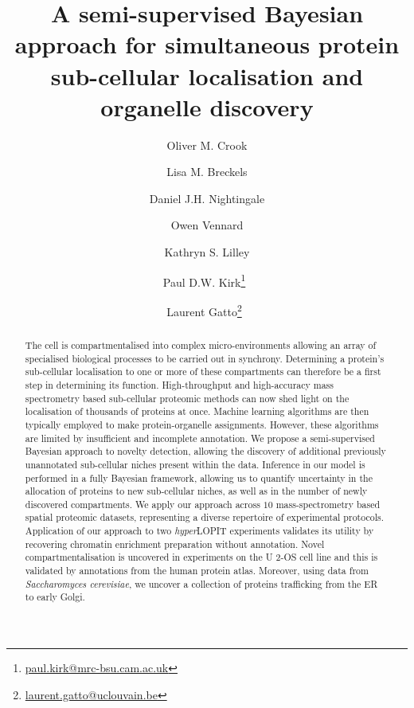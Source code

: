 \documentclass[12pt,english]{article}
\title{A semi-supervised Bayesian approach for simultaneous protein sub-cellular localisation and organelle discovery }
\author[1,2]{Oliver M. Crook}
\author[1]{Lisa M. Breckels}
\author[1]{Daniel J.H. Nightingale}
\author[1]{Owen Vennard}
\author[1]{Kathryn S. Lilley}
\author[2]{Paul D.W. Kirk\thanks{\url{paul.kirk@mrc-bsu.cam.ac.uk}}~}
\author[3]{Laurent Gatto\thanks{\url{laurent.gatto@uclouvain.be}}~}
\affil[1]{Cambridge Centre for Proteomics, Department of Biochemistry,
	University of Cambridge, Cambridge, UK}
\affil[2]{MRC Biostatistics Unit, Cambridge Institute for Public
	Health, Cambridge, UK}
\affil[3]{de Duve Institute, UCLouvain, Avenue
	Hippocrate 75, 1200 Brussels, Belgium}
\begin{document}
\maketitle

\begin{abstract}
The cell is compartmentalised into complex micro-environments allowing an array of
specialised biological processes to be carried out in synchrony. Determining a protein's sub-cellular localisation to one or more of these compartments can therefore be a first step in determining its function. High-throughput and high-accuracy mass spectrometry based sub-cellular proteomic methods can now shed light on the localisation of thousands of proteins at once. Machine learning algorithms are then typically employed to make protein-organelle assignments. However, these algorithms are limited by insufficient and incomplete annotation. We propose a semi-supervised Bayesian approach to novelty detection, allowing the discovery of additional previously unannotated sub-cellular niches present within the data. Inference in our model is performed in a fully Bayesian framework, allowing us to quantify uncertainty in the allocation of proteins to new sub-cellular niches, as well as in the number of newly discovered compartments. We apply our approach across $10$ mass-spectrometry based spatial proteomic datasets, representing a diverse repertoire of experimental protocols. Application of our approach to two \textit{hyper}LOPIT experiments validates its utility by recovering chromatin enrichment preparation without annotation. Novel compartmentalisation is uncovered in experiments on the U 2-OS cell line and this is validated by annotations from the human protein atlas. Moreover, using data from \textit{Saccharomyces cerevisiae}, we uncover a collection of proteins trafficking from the ER to early Golgi.
\end{abstract}
\clearpage
\end{document}
